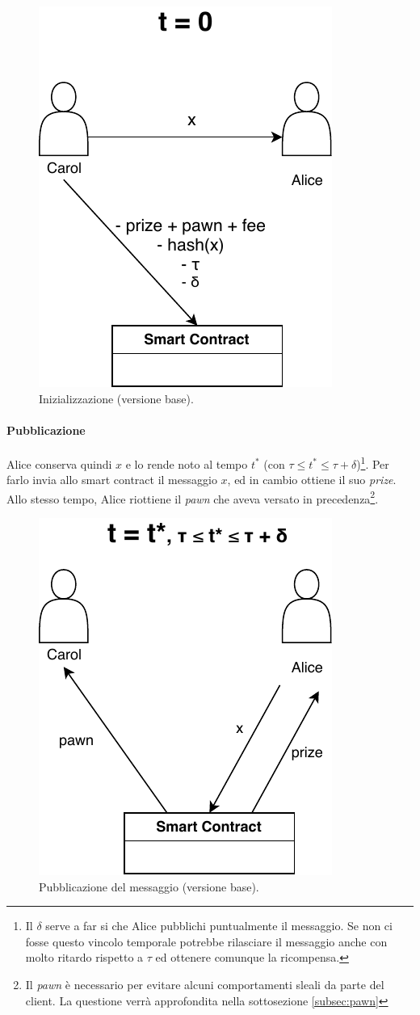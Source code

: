 \begin{figure}[H]
	\centering
	\includegraphics[width=0.3\linewidth]{images/chap_protocollo/base-creazione.pdf}
	\caption{Inizializzazione (versione base).}
\end{figure}

\paragraph{Pubblicazione}
Alice conserva quindi $ x $ e lo rende noto al tempo $ t^{*} $
(con $ \tau \leq t^{*} \leq \tau + \delta $)\footnote{Il $ \delta $ serve a far si che
	Alice pubblichi puntualmente il messaggio. Se non ci fosse questo vincolo temporale
	potrebbe rilasciare il messaggio anche con molto ritardo rispetto a
	$ \tau $ ed ottenere comunque
	la ricompensa.}.
Per farlo invia allo smart contract il messaggio $ x $,
ed in cambio ottiene il suo \textit{prize}.
Allo stesso tempo, Alice riottiene il \textit{pawn}
che aveva versato in precedenza\footnote{
	Il \textit{pawn} è necessario per evitare alcuni comportamenti sleali da parte del client.
	La questione verrà approfondita nella sottosezione \ref{subsec:pawn}}.
\begin{figure}[H]
	\centering
	\includegraphics[width=0.3\linewidth]{images/chap_protocollo/base-pubblicazione.pdf}
	\caption{Pubblicazione del messaggio (versione base).}
\end{figure}

